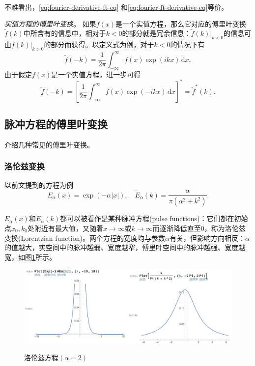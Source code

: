 不难看出，\eqref{eq:fourier-derivative-ft-eq} 和\eqref{eq:fourier-ft-derivative-eq}等价。

\textit{实值方程的傅里叶变换}。
如果$f(x)$是一个实值方程，那么它对应的傅里叶变换$\tilde{f}(k)$中所含有的信息中，相对于$k<0$的部分就是冗余信息：$\tilde{f}\left(k \right) \big|_{k <0 }$的信息可由$\tilde{f}\left(k \right) \big|_{k > 0}$的部分而获得。以定义式为例，对于$k<0$的情况下有
\begin{equation*}
\tilde{f}\left( - k \right) = \frac{1}{2 \pi} \int_{- \infty}^{\infty} f(x) \exp \left( i k x \right) \, \mathrm{d} x,
\end{equation*}
由于假定$f(x)$是一个实值方程，进一步可得
\begin{equation*}
  \tilde{f}(-k) =
  \left[
  \frac{1}{2 \pi} \int_{- \infty}^{\infty} f(x) \exp \left( - i k x \right) \, \mathrm{d} x
  \right]^{*}
  = \tilde{f}^{*} (k).
\end{equation*}


\subsection{脉冲方程的傅里叶变换}
\label{sec:fourier-function-types}
介绍几种常见的傅里叶变换。

\subsubsection{洛伦兹变换}
\label{sec:fourier-lorentzian-transformation}
以前文提到的方程为例
\begin{equation}
  \label{eq:fourier-lorentzian}
  E_{\alpha} \left( x \right) = \exp \left( - \alpha \left| x \right| \right), \quad \widetilde{E}_{\alpha} \left( k
  \right) = \frac{
  \alpha
  }{
  \pi \left( \alpha^{2} + k^{2} \right)
  }.
\end{equation}

$E_{\alpha} \left( x \right)$和$\widetilde{E}_{\alpha} \left( k
\right)$都可以被看作是某种脉冲方程(pulse functions)：它们都在初始点$x_{0} ,k_{0}$处附近有最大值，又随着$x \rightarrow \infty$或$k \rightarrow \infty$而逐渐降低直至$0$，称为洛伦兹变换(Lorentzian function)。两个方程的宽度均与参数$\alpha$有关，但影响方向相反：$\alpha$的值越大，实空间中的脉冲越弱、宽度越窄，傅里叶空间中的脉冲越强、宽度越宽，如图\ref{fig:fourier-lorentzian-trans}所示。
\begin{figure}[htbp]
   \caption{洛伦兹方程$(\alpha = 2)$}
  \centering
  \includegraphics[width=14cm]{./Figures/20180304-lorentzian-example.png}
  \label{fig:fourier-lorentzian-trans}
%
\end{figure}

